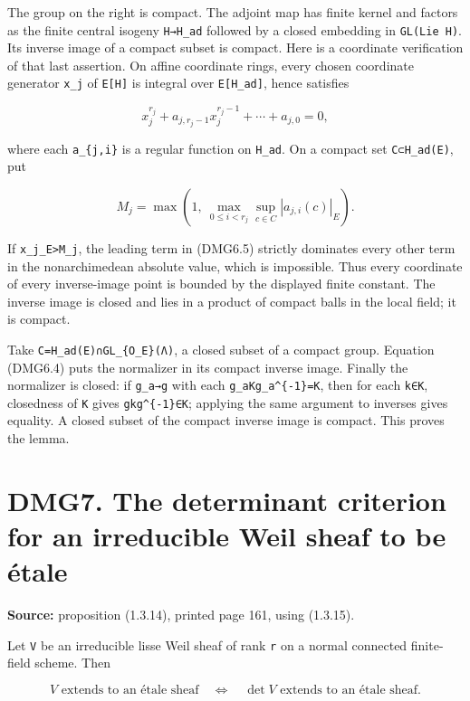 \documentclass[
]{report}
\begin{document}
The group on the right is compact. The adjoint map has finite kernel and
factors as the finite central isogeny \texttt{H→H\_ad} followed by a
closed embedding in \texttt{GL(Lie\ H)}. Its inverse image of a compact
subset is compact. Here is a coordinate verification of that last
assertion. On affine coordinate rings, every chosen coordinate generator
\texttt{x\_j} of \texttt{E{[}H{]}} is integral over
\texttt{E{[}H\_ad{]}}, hence satisfies

\[
x_j^{r_j}+a_{j,r_j-1}x_j^{r_j-1}+\cdots+a_{j,0}=0,
\tag{DMG6.5}
\]

where each \texttt{a\_\{j,i\}} is a regular function on \texttt{H\_ad}.
On a compact set \texttt{C⊂H\_ad(E)}, put

\[
M_j=\max\left(1,\ \max_{0\le i<r_j}\sup_{c\in C}|a_{j,i}(c)|_E\right).
\tag{DMG6.6}
\]

If \texttt{\textbar{}x\_j\textbar{}\_E\textgreater{}M\_j}, the leading
term in (DMG6.5) strictly dominates every other term in the
nonarchimedean absolute value, which is impossible. Thus every
coordinate of every inverse-image point is bounded by the displayed
finite constant. The inverse image is closed and lies in a product of
compact balls in the local field; it is compact.

Take \texttt{C=H\_ad(E)∩GL\_\{O\_E\}(Λ)}, a closed subset of a compact
group. Equation (DMG6.4) puts the normalizer in its compact inverse
image. Finally the normalizer is closed: if \texttt{g\_a→g} with each
\texttt{g\_aKg\_a\^{}\{-1\}=K}, then for each \texttt{k∈K}, closedness
of \texttt{K} gives \texttt{gkg\^{}\{-1\}∈K}; applying the same argument
to inverses gives equality. A closed subset of the compact inverse image
is compact. This proves the lemma.

\section{DMG7. The determinant criterion for an irreducible Weil sheaf
to be
étale}\label{dmg7.-the-determinant-criterion-for-an-irreducible-weil-sheaf-to-be-uxe9tale}

\textbf{Source:} proposition (1.3.14), printed page 161, using (1.3.15).

Let \texttt{V} be an irreducible lisse Weil sheaf of rank \texttt{r} on
a normal connected finite-field scheme. Then

\[
V\text{ extends to an étale sheaf}
\quad\Longleftrightarrow\quad
\det V\text{ extends to an étale sheaf}.
\tag{DMG7.1}
\]
\end{document}
